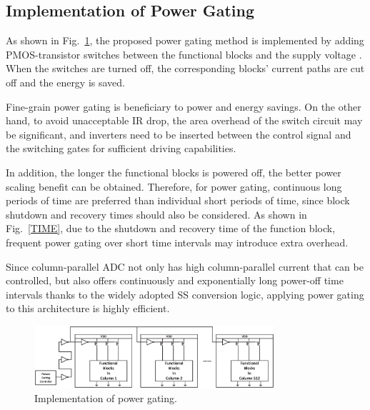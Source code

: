 
\subsection{Implementation of Power Gating}\label{gating1}

As shown in  Fig.~\ref{GATING}, the proposed power gating method is implemented by adding PMOS-transistor switches between the functional blocks and the supply voltage \cite{keating_low_2007}. 
When the switches are turned off, the corresponding blocks’ current paths are cut off and the energy is saved. 

Fine-grain power gating is beneficiary to power and energy savings. On the other hand, 
to avoid unacceptable IR drop, the area overhead of the switch circuit may be significant, 
and inverters need to be inserted between the control signal and the switching gates for 
sufficient driving capabilities. 

In addition, the longer the functional blocks is powered off, the better power scaling benefit can be obtained. Therefore, for power gating, continuous long periods of time are preferred than individual short periods of time, since block shutdown and recovery times should also be considered.
As shown in Fig.~\ref{TIME}, due to the shutdown and recovery time of the function block, frequent 
power gating over short time intervals may introduce extra overhead. 

Since column-parallel ADC not only has high column-parallel current that can be controlled, but also offers continuously and exponentially long power-off time intervals thanks to the widely adopted SS conversion logic, applying power gating to this architecture is highly efficient.

\begin{figure}[htbp]
	\centerline{\includegraphics[width=3.5in]{./Figures/GATING.eps}}
	\caption{Implementation of power gating.}
	\label{GATING}
\end{figure} 

